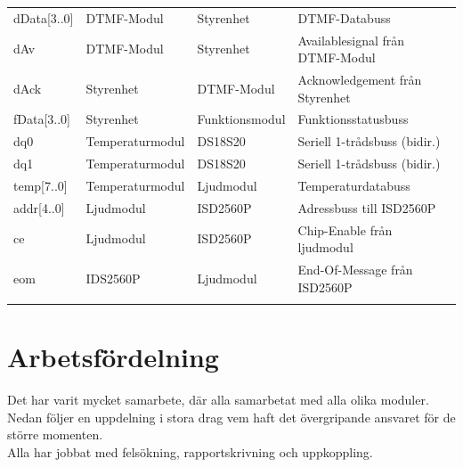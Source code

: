 \documentclass[a4paper,11pt]{article}
\begin{document}
\begin{table} [H]
\begin{tabular}{l l l l}
		dData[3..0] & DTMF-Modul & Styrenhet & DTMF-Databuss\\
		dAv & DTMF-Modul & Styrenhet & Availablesignal från DTMF-Modul\\
		dAck & Styrenhet & DTMF-Modul & Acknowledgement från Styrenhet\\

		fData[3..0] & Styrenhet & Funktionsmodul & Funktionsstatusbuss\\

		dq0 & Temperaturmodul & DS18S20 & Seriell 1-trådsbuss (bidir.)\\
		dq1 & Temperaturmodul & DS18S20 & Seriell 1-trådsbuss (bidir.)\\

		temp[7..0] & Temperaturmodul & Ljudmodul & Temperaturdatabuss\\

		addr[4..0] & Ljudmodul & ISD2560P & Adressbuss till ISD2560P\\
		ce & Ljudmodul & ISD2560P & Chip-Enable från ljudmodul\\
		eom & IDS2560P & Ljudmodul & End-Of-Message från ISD2560P\\\\
	\end{tabular}
	\end{table}
\pagebreak
	\section{Arbetsfördelning}
	\label{sec:arbetsSec}
	
		Det har varit mycket samarbete, där alla samarbetat med alla olika moduler. \\
		Nedan följer en uppdelning i stora drag vem haft det övergripande ansvaret för de större momenten. \\
		Alla har jobbat med felsökning, rapportskrivning och uppkoppling.
	
\end{document}
